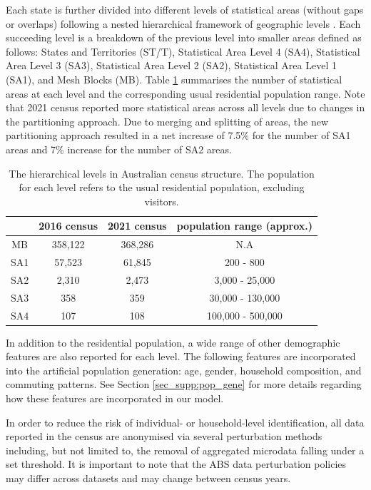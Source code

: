 \documentclass{article}
\begin{document}
\begin{appendices}
Each state is  further divided into different levels of statistical areas (without gaps or overlaps) following a nested hierarchical framework of geographic levels \cite{abs_general_webpage}. Each succeeding level is a breakdown of the previous level into smaller areas defined as follows: States and Territories (ST/T), Statistical Area Level 4 (SA4), Statistical Area Level 3 (SA3), Statistical Area Level 2 (SA2), Statistical Area Level 1 (SA1), and Mesh Blocks (MB). Table \ref{tab_sup:SA} summarises the number of statistical areas at each level and the corresponding usual residential population range. Note that 2021 census reported more statistical areas across all levels due to changes in the partitioning approach. Due to merging and splitting of areas, the new partitioning approach  resulted in a net increase of 7.5\% for the number of SA1 areas and 7\% increase for the number of SA2 areas.

\begin{table}[ht]
\centering
    \begin{tabular}{c|c|c|c}
    \hline
         &  2016 census & 2021 census & population range (approx.) \\
         \hline \hline
        MB & 358,122 & 368,286 & N.A  \\
        SA1 & 57,523 & 61,845 &200 - 800 \\
        SA2 & 2,310 & 2,473 & 3,000 - 25,000 \\
        SA3 & 358 & 359 & 30,000 - 130,000 \\
        SA4 & 107 & 108 & 100,000 - 500,000 \\
        \hline
    \end{tabular}
    \caption{The hierarchical levels in Australian census structure. The population for each level refers to the usual residential population, excluding visitors.}
    \label{tab_sup:SA}
\end{table}

In addition to the residential population, a wide range of other demographic features are also reported for each level. The following features are incorporated into the artificial population generation: age, gender, household composition, and commuting patterns. See Section \ref{sec_supp:pop_gene} for more details regarding how these features are incorporated in our model.

In order to reduce the risk of individual- or household-level identification, all data reported in the census are anonymised via several perturbation methods including, but not limited to, the removal of aggregated microdata falling under a set threshold. It is important to note that the ABS data perturbation policies may differ across datasets and may change between census years.


\end{appendices}
\end{document}
